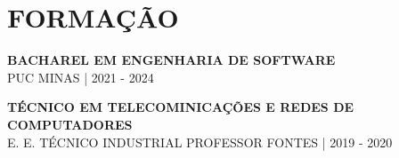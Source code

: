 
    \section{FORMAÇÃO}

    \normalsize\textbf{BACHAREL EM ENGENHARIA DE SOFTWARE}\\
    \footnotesize{PUC MINAS | 2021 - 2024}

    \normalsize\textbf{TÉCNICO EM TELECOMINICAÇÕES E REDES DE COMPUTADORES}\\
    \footnotesize{E. E. TÉCNICO INDUSTRIAL PROFESSOR FONTES | 2019 - 2020}
